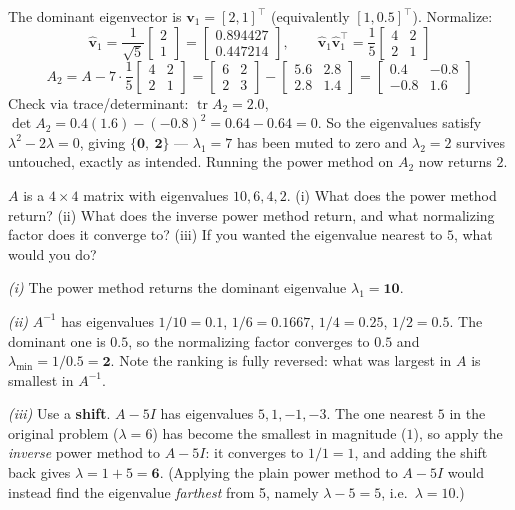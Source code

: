 \begin{probbox}
\ans The dominant eigenvector is $\mathbf v_1 = [2,1]^\top$ (equivalently $[1,0.5]^\top$). Normalize:
\[
\hat{\mathbf v}_1 = \frac{1}{\sqrt5}\begin{bmatrix}2\\1\end{bmatrix} = \begin{bmatrix}0.894427\\0.447214\end{bmatrix},
\qquad
\hat{\mathbf v}_1\hat{\mathbf v}_1^\top = \frac15\begin{bmatrix}4&2\\2&1\end{bmatrix}
\]
\[
A_2 = A - 7\cdot\frac15\begin{bmatrix}4&2\\2&1\end{bmatrix}
= \begin{bmatrix}6&2\\2&3\end{bmatrix} - \begin{bmatrix}5.6&2.8\\2.8&1.4\end{bmatrix}
= \begin{bmatrix}0.4&-0.8\\-0.8&1.6\end{bmatrix}
\]
Check via trace/determinant: $\operatorname{tr}A_2 = 2.0$, $\det A_2 = 0.4(1.6)-(-0.8)^2 = 0.64-0.64 = 0$. So the eigenvalues satisfy $\lambda^2-2\lambda = 0$, giving $\{\mathbf{0},\ \mathbf{2}\}$ --- $\lambda_1 = 7$ has been muted to zero and $\lambda_2 = 2$ survives untouched, exactly as intended. Running the power method on $A_2$ now returns $2$.

 $A$ is a $4\times4$ matrix with eigenvalues $10, 6, 4, 2$. (i) What does the power method return? (ii) What does the inverse power method return, and what normalizing factor does it converge to? (iii) If you wanted the eigenvalue nearest to $5$, what would you do?

\ans \emph{(i)} The power method returns the dominant eigenvalue $\lambda_1 = \mathbf{10}$.

\emph{(ii)} $A^{-1}$ has eigenvalues $1/10 = 0.1$, $1/6 = 0.1667$, $1/4 = 0.25$, $1/2 = 0.5$. The dominant one is $0.5$, so the normalizing factor converges to $\mathbf{0.5}$ and $\lambda_{\min} = 1/0.5 = \mathbf{2}$. Note the ranking is fully reversed: what was largest in $A$ is smallest in $A^{-1}$.

\emph{(iii)} Use a \textbf{shift}. $A - 5I$ has eigenvalues $5, 1, -1, -3$. The one nearest $5$ in the original problem ($\lambda = 6$) has become the smallest in magnitude ($1$), so apply the \emph{inverse} power method to $A-5I$: it converges to $1/1 = 1$, and adding the shift back gives $\lambda = 1+5 = \mathbf{6}$. (Applying the plain power method to $A-5I$ would instead find the eigenvalue \emph{farthest} from 5, namely $\lambda-5 = 5$, i.e.\ $\lambda = 10$.)
\end{probbox}

